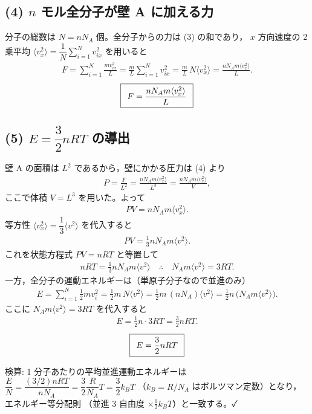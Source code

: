 \documentclass[11pt,a4paper]{article}
\begin{document}
\subsection*{(4) $n$ モル全分子が壁 A に加える力}
分子の総数は $N=n N_A$ 個。全分子からの力は (3) の和であり，
$x$ 方向速度の 2 乗平均 $\langle v_x^2\rangle=\dfrac{1}{N}\sum_{i=1}^{N}v_{ix}^2$ を用いると
\begin{align*}
  F=\sum_{i=1}^{N}\frac{m v_{ix}^2}{L}
   =\frac{m}{L}\sum_{i=1}^{N}v_{ix}^2
   =\frac{m}{L}\,N\langle v_x^2\rangle
   =\frac{n N_A m\langle v_x^2\rangle}{L}.
\end{align*}
\[
  \boxed{\,\;F=\dfrac{n N_A m\langle v_x^2\rangle}{L}\;\,}
\]

\subsection*{(5) $E=\dfrac{3}{2}nRT$ の導出}
壁 A の面積は $L^2$ であるから，壁にかかる圧力は (4) より
\begin{align*}
  P=\frac{F}{L^2}=\frac{n N_A m\langle v_x^2\rangle}{L^3}
   =\frac{n N_A m\langle v_x^2\rangle}{V},
\end{align*}
ここで体積 $V=L^3$ を用いた。よって
\begin{align*}
  PV=n N_A m\langle v_x^2\rangle.
\end{align*}
等方性 $\langle v_x^2\rangle=\dfrac{1}{3}\langle v^2\rangle$ を代入すると
\begin{align*}
  PV=\frac{1}{3}n N_A m\langle v^2\rangle.
\end{align*}
これを状態方程式 $PV=nRT$ と等置して
\begin{align*}
  nRT=\frac{1}{3}n N_A m\langle v^2\rangle
  \quad\therefore\quad
  N_A m\langle v^2\rangle=3RT.
\end{align*}
一方，全分子の運動エネルギーは（単原子分子なので並進のみ）
\begin{align*}
  E=\sum_{i=1}^{N}\frac{1}{2}m v_i^2
   =\frac{1}{2}m\,N\langle v^2\rangle
   =\frac{1}{2}m\,(n N_A)\langle v^2\rangle
   =\frac{1}{2}n\,\bigl(N_A m\langle v^2\rangle\bigr).
\end{align*}
ここに $N_A m\langle v^2\rangle=3RT$ を代入すると
\begin{align*}
  E=\frac{1}{2}n\cdot 3RT=\frac{3}{2}nRT.
\end{align*}
\[
  \boxed{\,\;E=\dfrac{3}{2}nRT\;\,}
\]

\medskip
検算: 1 分子あたりの平均並進運動エネルギーは
$\dfrac{E}{N}=\dfrac{(3/2)nRT}{n N_A}=\dfrac{3}{2}\dfrac{R}{N_A}T=\dfrac{3}{2}k_B T$
（$k_B=R/N_A$ はボルツマン定数）となり，エネルギー等分配則
（並進 3 自由度 $\times\frac12 k_B T$）と一致する。✓
\end{document}
